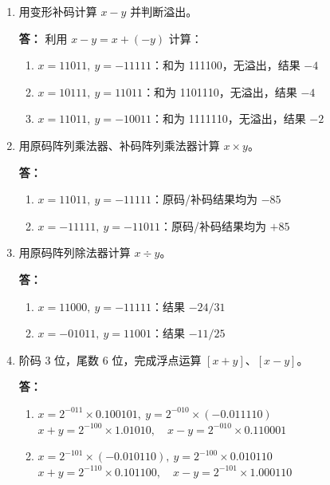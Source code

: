 \documentclass{article}
\begin{document}
\begin{enumerate}[label=\arabic*.]
    \item 用变形补码计算 $x-y$ 并判断溢出。
    
    \textbf{答：}
    利用 $x-y=x+(-y)$ 计算：
    \begin{enumerate}[label=(\arabic*)]
        \item $x=11011,\ y=-11111$：和为 111100，无溢出，结果 $-4$
        \item $x=10111,\ y=11011$：和为 1101110，无溢出，结果 $-4$
        \item $x=11011,\ y=-10011$：和为 1111110，无溢出，结果 $-2$
    \end{enumerate}

    \item 用原码阵列乘法器、补码阵列乘法器计算 $x \times y$。
    
    \textbf{答：}
    \begin{enumerate}[label=(\arabic*)]
        \item $x=11011,\ y=-11111$：原码/补码结果均为 $-85$
        \item $x=-11111,\ y=-11011$：原码/补码结果均为 $+85$
    \end{enumerate}

    \item 用原码阵列除法器计算 $x \div y$。
    
    \textbf{答：}
    \begin{enumerate}[label=(\arabic*)]
        \item $x=11000,\ y=-11111$：结果 $-24/31$
        \item $x=-01011,\ y=11001$：结果 $-11/25$
    \end{enumerate}

    \item 阶码 3 位，尾数 6 位，完成浮点运算 $[x+y]$、$[x-y]$。
    
    \textbf{答：}
    \begin{enumerate}[label=(\arabic*)]
        \item $x=2^{-011}\times0.100101,\ y=2^{-010}\times(-0.011110)$ \\
        $x+y=2^{-100}\times1.01010,\quad x-y=2^{-010}\times0.110001$
        \item $x=2^{-101}\times(-0.010110),\ y=2^{-100}\times0.010110$ \\
        $x+y=2^{-110}\times0.101100,\quad x-y=2^{-101}\times1.000110$
    \end{enumerate}


\end{enumerate}
\end{document}
